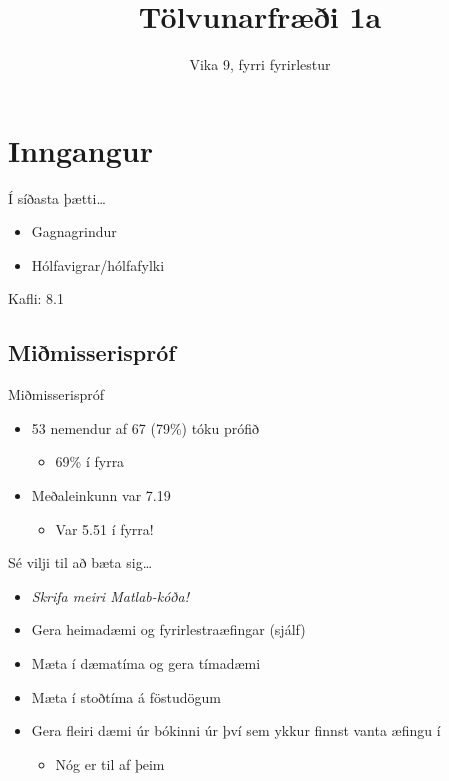 \documentclass{beamer}
\title{Tölvunarfræði 1a}
\subtitle{Vika 9, fyrri fyrirlestur}
\begin{document}
\begin{frame}
\titlepage
\end{frame}

\section{Inngangur}

\begin{frame}{Í síðasta þætti\ldots}
\begin{itemize}
 \item Gagnagrindur
 \item Hólfavigrar/hólfafylki
\end{itemize}
Kafli: 8.1
\end{frame}

\subsection{Miðmisserispróf}

\begin{frame}{Miðmisserispróf}
\pause
\begin{itemize}
 \item 53 nemendur af 67 (79\%) tóku prófið \pause
 \begin{itemize}
  \item 69\% í fyrra 
 \end{itemize} \pause
 \item Meðaleinkunn var 7.19 \pause
 \begin{itemize}
  \item Var 5.51 í fyrra!
 \end{itemize}
\end{itemize}
\end{frame}

\begin{frame}{Sé vilji til að bæta sig\ldots}
\begin{itemize}
 \item \emph{Skrifa meiri Matlab-kóða!}
 \item Gera heimadæmi og fyrirlestraæfingar (sjálf)
 \item Mæta í dæmatíma og gera tímadæmi
 \item Mæta í stoðtíma á föstudögum
 \item Gera fleiri dæmi úr bókinni úr því sem ykkur finnst vanta æfingu í
 \begin{itemize}
  \item Nóg er til af þeim
 \end{itemize}
\end{itemize}
\end{frame}
\end{document}

